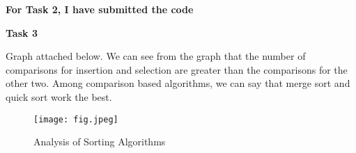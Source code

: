 \documentclass[a4paper]{exam}
\begin{document}
\begin{questions}
\begin{solution}
   \begin{center}
       \textbf{For Task 2, I have submitted the code}
   \end{center}
   \begin{center}
      \textbf{Task 3}
   \end{center}
   Graph attached below. We can see from the graph that the number of comparisons for insertion and selection are greater than the comparisons for the other two. Among comparison based algorithms, we can say that merge sort and quick sort work the best. 
   \begin{figure}[H]
       \centering
       \texttt{[image: fig.jpeg]}
       \caption{Analysis of Sorting Algorithms}
       \label{fig:my_label}
   \end{figure}
  \end{solution}


\end{questions}
\end{document}
